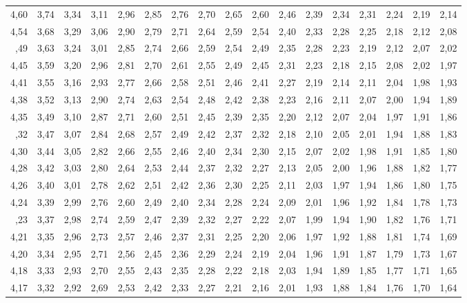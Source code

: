 \documentclass[
  11pt,
  french,
]{book}
\begin{document}
\begin{table}
\begin{tabular}[t]{rrrrrrrrrrrrrrrrr}
4,60 & 3,74 & 3,34 & 3,11 & 2,96 & 2,85 & 2,76 & 2,70 & 2,65 & 2,60 & 2,46 & 2,39 & 2,34 & 2,31 & 2,24 & 2,19 & 2,14\\
4,54 & 3,68 & 3,29 & 3,06 & 2,90 & 2,79 & 2,71 & 2,64 & 2,59 & 2,54 & 2,40 & 2,33 & 2,28 & 2,25 & 2,18 & 2,12 & 2,08\\
\addlinespace
4,49 & 3,63 & 3,24 & 3,01 & 2,85 & 2,74 & 2,66 & 2,59 & 2,54 & 2,49 & 2,35 & 2,28 & 2,23 & 2,19 & 2,12 & 2,07 & 2,02\\
4,45 & 3,59 & 3,20 & 2,96 & 2,81 & 2,70 & 2,61 & 2,55 & 2,49 & 2,45 & 2,31 & 2,23 & 2,18 & 2,15 & 2,08 & 2,02 & 1,97\\
4,41 & 3,55 & 3,16 & 2,93 & 2,77 & 2,66 & 2,58 & 2,51 & 2,46 & 2,41 & 2,27 & 2,19 & 2,14 & 2,11 & 2,04 & 1,98 & 1,93\\
4,38 & 3,52 & 3,13 & 2,90 & 2,74 & 2,63 & 2,54 & 2,48 & 2,42 & 2,38 & 2,23 & 2,16 & 2,11 & 2,07 & 2,00 & 1,94 & 1,89\\
4,35 & 3,49 & 3,10 & 2,87 & 2,71 & 2,60 & 2,51 & 2,45 & 2,39 & 2,35 & 2,20 & 2,12 & 2,07 & 2,04 & 1,97 & 1,91 & 1,86\\
\addlinespace
4,32 & 3,47 & 3,07 & 2,84 & 2,68 & 2,57 & 2,49 & 2,42 & 2,37 & 2,32 & 2,18 & 2,10 & 2,05 & 2,01 & 1,94 & 1,88 & 1,83\\
4,30 & 3,44 & 3,05 & 2,82 & 2,66 & 2,55 & 2,46 & 2,40 & 2,34 & 2,30 & 2,15 & 2,07 & 2,02 & 1,98 & 1,91 & 1,85 & 1,80\\
4,28 & 3,42 & 3,03 & 2,80 & 2,64 & 2,53 & 2,44 & 2,37 & 2,32 & 2,27 & 2,13 & 2,05 & 2,00 & 1,96 & 1,88 & 1,82 & 1,77\\
4,26 & 3,40 & 3,01 & 2,78 & 2,62 & 2,51 & 2,42 & 2,36 & 2,30 & 2,25 & 2,11 & 2,03 & 1,97 & 1,94 & 1,86 & 1,80 & 1,75\\
4,24 & 3,39 & 2,99 & 2,76 & 2,60 & 2,49 & 2,40 & 2,34 & 2,28 & 2,24 & 2,09 & 2,01 & 1,96 & 1,92 & 1,84 & 1,78 & 1,73\\
\addlinespace
4,23 & 3,37 & 2,98 & 2,74 & 2,59 & 2,47 & 2,39 & 2,32 & 2,27 & 2,22 & 2,07 & 1,99 & 1,94 & 1,90 & 1,82 & 1,76 & 1,71\\
4,21 & 3,35 & 2,96 & 2,73 & 2,57 & 2,46 & 2,37 & 2,31 & 2,25 & 2,20 & 2,06 & 1,97 & 1,92 & 1,88 & 1,81 & 1,74 & 1,69\\
4,20 & 3,34 & 2,95 & 2,71 & 2,56 & 2,45 & 2,36 & 2,29 & 2,24 & 2,19 & 2,04 & 1,96 & 1,91 & 1,87 & 1,79 & 1,73 & 1,67\\
4,18 & 3,33 & 2,93 & 2,70 & 2,55 & 2,43 & 2,35 & 2,28 & 2,22 & 2,18 & 2,03 & 1,94 & 1,89 & 1,85 & 1,77 & 1,71 & 1,65\\
4,17 & 3,32 & 2,92 & 2,69 & 2,53 & 2,42 & 2,33 & 2,27 & 2,21 & 2,16 & 2,01 & 1,93 & 1,88 & 1,84 & 1,76 & 1,70 & 1,64\\

\end{tabular}
\end{table}
\end{document}
